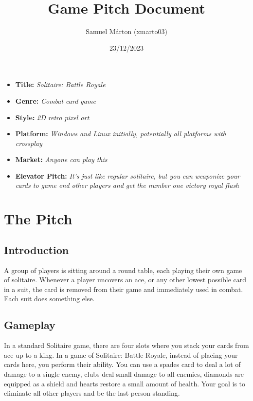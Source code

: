 \documentclass[a4paper,10pt,english]{article}
\title{%
Game Pitch Document%
}
\author{%
Samuel Márton (xmarto03)%
}
\date{23/12/2023}
\begin{document}
\maketitle
\thispagestyle{empty}

{%
\large

\begin{itemize}

\item[] \textbf{Title:} \textit{Solitaire: Battle Royale}

\item[] \textbf{Genre:} \textit{Combat card game}

\item[] \textbf{Style:} \textit{2D retro pixel art}

\item[] \textbf{Platform:} \textit{Windows and Linux initially, potentially all platforms with crossplay}

\item[] \textbf{Market:} \textit{Anyone can play this}

\item[] \textbf{Elevator Pitch:} \textit{It's just like regular solitaire, but you can weaponize your cards to game end other players and get the number one victory royal flush}

\end{itemize}

}

\section*{\centering The Pitch}

\subsection*{Introduction}

A group of players is sitting around a round table, each playing their own game of solitaire. Whenever a player uncovers an ace, or any other lowest possible card in a suit, the card is removed from their game and immediately used in combat. Each suit does something else.

\subsection*{Gameplay}

In a standard Solitaire game, there are four slots where you stack your cards from ace up to a king. In a game of Solitaire: Battle Royale, instead of placing your cards here, you perform their ability. You can use a spades card to deal a lot of damage to a single enemy, clubs deal small damage to all enemies, diamonds are equipped as a shield and hearts restore a small amount of health. Your goal is to eliminate all other players and be the last person standing.
\end{document}
